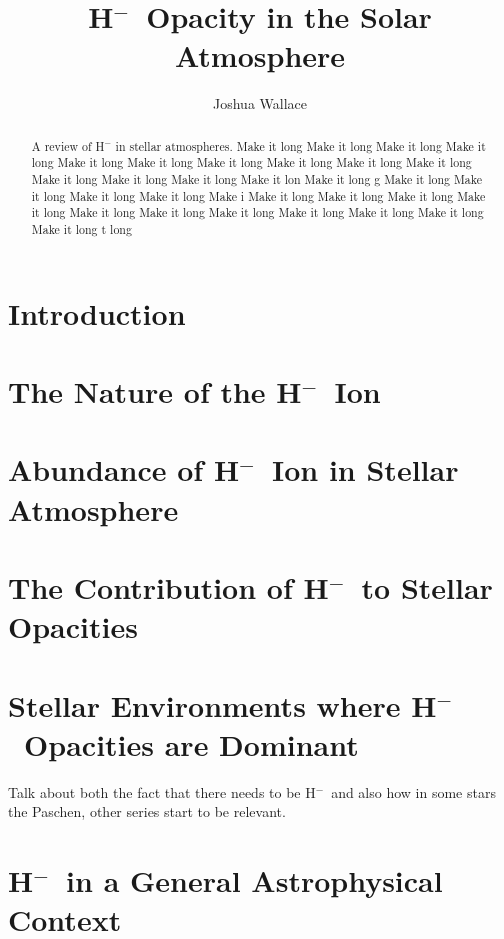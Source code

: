 \documentclass{emulateapj}
\def\h{H$^-$}
\begin{document}
\title{\h\ Opacity in the Solar Atmosphere}

\author{Joshua Wallace}


\begin{abstract}
A review of H$^-$ in stellar atmospheres. Make it long  Make it long  Make it long  Make it long  Make it long  Make it long  Make it long  Make it long  Make it long  Make it long  Make it long  Make it long  Make it long  Make it lon Make it long g  Make it long  Make it long  Make it long  Make it long  Make i Make it long  Make it long  Make it long  Make it long  Make it long  Make it long  Make it long  Make it long  Make it long  Make it long  Make it long t long 
\end{abstract}


\section{Introduction}


%

\section{The Nature of the \h\ Ion}


\section{Abundance of \h\ Ion in Stellar Atmosphere}


\section{The Contribution of \h\ to Stellar Opacities}


\section{Stellar Environments where \h\ Opacities are Dominant}
Talk about both the fact that there needs to be \h\ and also how in
some stars the Paschen, other series start to be relevant.

\section{\h\ in a General Astrophysical Context}





\end{document}
